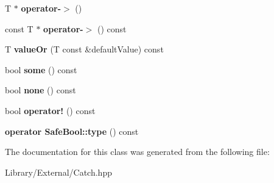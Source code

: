 \begin{DoxyCompactItemize}
\item 
\hypertarget{class_catch_1_1_option_acad340798a16c8f700f8763119e90f31}{}T $\ast$ {\bfseries operator-\/$>$} ()\label{class_catch_1_1_option_acad340798a16c8f700f8763119e90f31}

\item 
\hypertarget{class_catch_1_1_option_a0800340b2971748671b88acfb14bb928}{}const T $\ast$ {\bfseries operator-\/$>$} () const \label{class_catch_1_1_option_a0800340b2971748671b88acfb14bb928}

\item 
\hypertarget{class_catch_1_1_option_a21b5629a7febbe3e23c475c9d9138a2d}{}T {\bfseries value\+Or} (T const \&default\+Value) const \label{class_catch_1_1_option_a21b5629a7febbe3e23c475c9d9138a2d}

\item 
\hypertarget{class_catch_1_1_option_affa96f15798b4656fb753ff52d12dec2}{}bool {\bfseries some} () const \label{class_catch_1_1_option_affa96f15798b4656fb753ff52d12dec2}

\item 
\hypertarget{class_catch_1_1_option_a389324d2aa20ceb0eb0f48a5f77c20c8}{}bool {\bfseries none} () const \label{class_catch_1_1_option_a389324d2aa20ceb0eb0f48a5f77c20c8}

\item 
\hypertarget{class_catch_1_1_option_a47a1b6f6def2730ea9d27a1860a4f97f}{}bool {\bfseries operator!} () const \label{class_catch_1_1_option_a47a1b6f6def2730ea9d27a1860a4f97f}

\item 
\hypertarget{class_catch_1_1_option_a637d4366ae7f0ded52ce59c8cb06da7b}{}{\bfseries operator Safe\+Bool\+::type} () const \label{class_catch_1_1_option_a637d4366ae7f0ded52ce59c8cb06da7b}

\end{DoxyCompactItemize}


The documentation for this class was generated from the following file\+:\begin{DoxyCompactItemize}
\item 
Library/\+External/Catch.\+hpp\end{DoxyCompactItemize}
